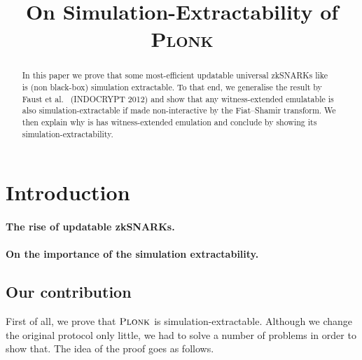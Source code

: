 \documentclass[runningheads,11pt]{llncs}
\title{On Simulation-Extractability of \textsc{Plonk}}
\theoremstyle{definition}
\begin{document}
	\sloppy
	\maketitle

\begin{abstract}
	In this paper we prove that some most-efficient updatable universal zkSNARKs like \plonk{}~\cite{EPRINT:GabWilCio19}  is (non black-box) simulation extractable.
	To that end, we generalise the result by Faust et al.~\cite{INDOCRYPT:FKMV12} (INDOCRYPT 2012) and show that any witness-extended emulatable is also simulation-extractable if made non-interactive by the Fiat--Shamir transform. We then explain why \plonk{} is has witness-extended emulation and conclude by showing its simulation-extractability.
\end{abstract}

\section{Introduction}
\paragraph{The rise of updatable zkSNARKs.}
\cite{C:GKMMM18}
\cite{EC:CHMMVW20}
\cite{CCS:MBKM19}
\cite{EPRINT:GabWilCio19}
\cite{EPRINT:Gabizon19c}
\cite{EPRINT:Lipmaa19a}

\paragraph{On the importance of the simulation extractability.}
\cite{AC:DHLW10}
\cite{AC:Groth07}
\cite{EPRINT:AbdRamSla20}
\cite{EPRINT:KZMQCP15}
\cite{EPRINT:AtaBag19}

\subsection{Our contribution}
First of all, we prove that $\textsc{Plonk}$ is simulation-extractable. Although we change the original protocol only little, we had to solve a number of problems in order to show that. The idea of the proof goes as follows.
\end{document}
